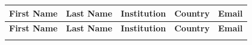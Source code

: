 \begin{longtable}{@{}
  >{\raggedright\arraybackslash}p{}
  >{\raggedright\arraybackslash}p{}
  >{\raggedright\arraybackslash}p{}
  >{\raggedright\arraybackslash}p{}
  >{\raggedright\arraybackslash}p{}
@{}}
\hline
\textbf{First Name} &
\textbf{Last Name} &
\textbf{Institution} &
\textbf{Country} &
\textbf{Email} \\
\hline
\endfirsthead

\hline
\textbf{First Name} &
\textbf{Last Name} &
\textbf{Institution} &
\textbf{Country} &
\textbf{Email} \\
\hline
\endhead

\hline
\endfoot


\end{longtable}
